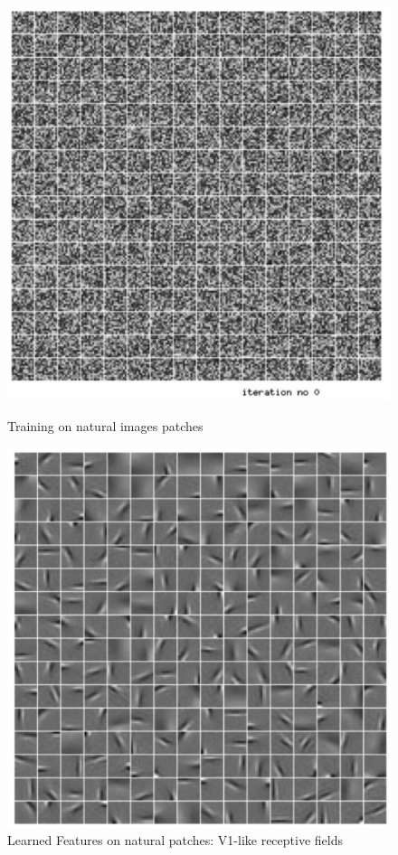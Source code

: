 \begin{figure}[H]

\begin{minipage}[b]{.4\textwidth}
  \includegraphics[width=\textwidth,left]{figs/natural_0.png}
  \caption{Training on natural images patches}
  \label{natural_0}
\end{minipage}
\begin{minipage}[b]{.4\textwidth}
  \includegraphics[width=\textwidth,right]{figs/natural.png}
  \caption{Learned Features on natural patches:
V1-like receptive fields}
  \label{natural}
\end{minipage}
\end{figure}

